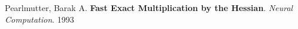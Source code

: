 \documentclass[]{article}
\newcommand{\tab}{\hspace*{.25in}}
\theoremstyle{plain}
\theoremstyle{definition}
\begin{document}
\hangindent=0.5in
Pearlmutter, Barak A. \textbf{Fast Exact Multiplication by the Hessian}. \textit{Neural Computation}. 1993
\end{document}
